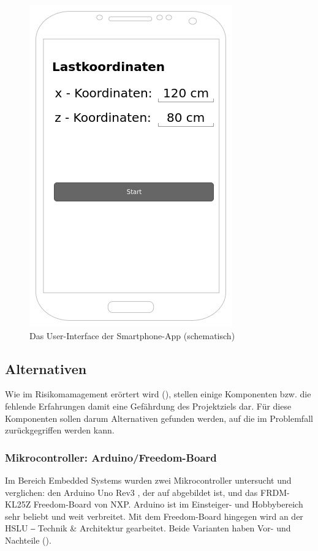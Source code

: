 \begin{figure}
    \centering
    \includegraphics[width=0.5\linewidth]{pics/app.jpg}
    \caption{Das User-Interface der Smartphone-App (schematisch)}
    \label{fig:app}
\end{figure}

\subsection{Alternativen}
\label{sec:komponenten-alternativen}

Wie im Risikomamagement erörtert wird (), stellen einige Komponenten bzw. die fehlende Erfahrungen damit eine Gefährdung des Projektziels dar. Für diese Komponenten sollen darum Alternativen gefunden werden, auf die im Problemfall zurückgegriffen werden kann.

\subsubsection{Mikrocontroller: Arduino/Freedom-Board}

Im Bereich Embedded Systems wurden zwei Mikrocontroller untersucht und verglichen: den Arduino Uno Rev3 , der auf  abgebildet ist, und das FRDM-KL25Z Freedom-Board von NXP. Arduino ist im Einsteiger- und Hobbybereich sehr beliebt und weit verbreitet. Mit dem Freedom-Board hingegen wird an der HSLU ‒ Technik \& Architektur gearbeitet. Beide Varianten haben Vor- und Nachteile ().

